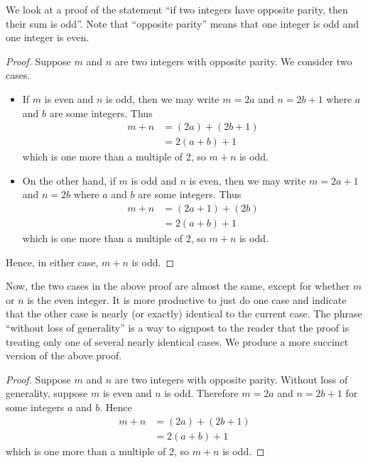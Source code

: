 \begin{example}
    We look at a proof of the statement ``if two integers have opposite parity, then their sum is odd''. Note that ``opposite parity'' means that one integer is odd and one integer is even.
    \begin{proof}
        Suppose $m$ and $n$ are two integers with opposite parity. We consider two cases.
        \begin{itemize}
            \item If $m$ is even and $n$ is odd, then we may write $m = 2a$ and $n = 2b + 1$ where $a$ and $b$ are some integers. Thus
            \begin{align*}
                m + n &= (2a) + (2b + 1)\\
                &= 2(a+b) + 1
            \end{align*}
            which is one more than a multiple of 2, so $m + n$ is odd.
            \item On the other hand, if $m$ is odd and $n$ is even, then we may write $m = 2a + 1$ and $n = 2b$ where $a$ and $b$ are some integers. Thus
            \begin{align*}
                m + n &= (2a + 1) + (2b)\\
                &= 2(a+b) + 1
            \end{align*}
            which is one more than a multiple of 2, so $m + n$ is odd.
        \end{itemize}
        Hence, in either case, $m + n$ is odd.
    \end{proof}

    Now, the two cases in the above proof are almost the same, except for whether $m$ or $n$ is the even integer. It is more productive to just do one case and indicate that the other case is nearly (or exactly) identical to the current case. The phrase ``without loss of generality'' is a way to signpost to the reader that the proof is treating only one of several nearly identical cases. We produce a more succinct version of the above proof.

    \begin{proof}
        Suppose $m$ and $n$ are two integers with opposite parity. Without loss of generality, suppose $m$ is even and $n$ is odd. Therefore $m = 2a$ and $n = 2b + 1$ for some integers $a$ and $b$. Hence
        \begin{align*}
            m + n &= (2a) + (2b + 1)\\
            &= 2(a+b) + 1
        \end{align*}
        which is one more than a multiple of 2, so $m + n$ is odd.
    \end{proof}
\end{example}

